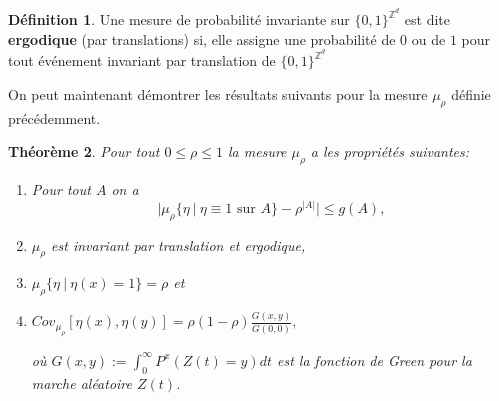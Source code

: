 \documentclass[a4paper,11pt]{article}
\theoremstyle{break}
\theoremstyle{break}
\newtheorem{theorem}{Théorème}[section]
\theoremstyle{definition}
\newtheorem{definition}[theorem]{Définition}
\theoremstyle{remark}
\begin{document}
\begin{definition}%
Une mesure de probabilité invariante sur $\{0,1\}^{\mathbb{Z}^d}$ est dite \textbf{ergodique} (par translations) si, elle assigne une probabilité de $0$ ou de $1$ pour tout événement invariant par translation de $\{0,1\}^{\mathbb{Z}^d}$
\end{definition}

On peut maintenant démontrer les résultats suivants pour la mesure $\mu_\rho$ définie précédemment.

\begin{theorem}\label{mu nu}
Pour tout $0\leq\rho\leq 1$ la mesure $\mu_\rho$ a les propriétés suivantes:
\begin{enumerate}
\item Pour tout $A$ on a
$$
\vert \mu_\rho \{\eta \ \vert \ \eta \equiv 1 \text{ sur } A\} - \rho^{\vert A\vert}\vert\leq g(A),
$$
\item $\mu_\rho$ est invariant par translation et ergodique,
\item $\mu_\rho\{\eta \ \vert \ \eta(x) = 1\}=\rho$ et
\item $Cov_{\mu_\rho}[\eta (x), \eta (y)]=\rho(1-\rho)\frac{G(x,y)}{G(0,0)},$

où $G(x,y):=\int_0^\infty P^x(Z(t)=y)dt$ est la fonction de Green pour la marche aléatoire $Z(t)$.
\end{enumerate}
\end{theorem}
\end{document}
